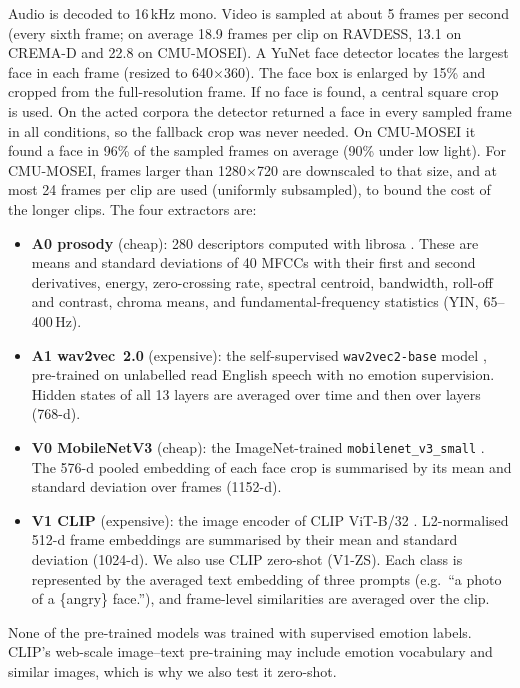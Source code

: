 Audio is decoded to 16\,kHz mono. Video is sampled at about 5 frames per second (every sixth frame; on average 18.9 frames per clip on RAVDESS, 13.1 on CREMA-D and 22.8 on CMU-MOSEI). A YuNet face detector \citep{wu2023yunet} locates the largest face in each frame (resized to 640$\times$360). The face box is enlarged by 15\% and cropped from the full-resolution frame. If no face is found, a central square crop is used. On the acted corpora the detector returned a face in every sampled frame in all conditions, so the fallback crop was never needed. On CMU-MOSEI it found a face in 96\% of the sampled frames on average (90\% under low light). For CMU-MOSEI, frames larger than 1280$\times$720 are downscaled to that size, and at most 24 frames per clip are used (uniformly subsampled), to bound the cost of the longer clips. The four extractors are:
\begin{itemize}
\item \textbf{A0 prosody} (cheap): 280 descriptors computed with librosa \citep{mcfee2015}. These are means and standard deviations of 40 MFCCs with their first and second derivatives, energy, zero-crossing rate, spectral centroid, bandwidth, roll-off and contrast, chroma means, and fundamental-frequency statistics (YIN, 65--400\,Hz).
\item \textbf{A1 wav2vec~2.0} (expensive): the self-supervised \texttt{wav2vec2-base} model \citep{baevski2020}, pre-trained on unlabelled read English speech with no emotion supervision. Hidden states of all 13 layers are averaged over time and then over layers (768-d).
\item \textbf{V0 MobileNetV3} (cheap): the ImageNet-trained \texttt{mobilenet\_v3\_small} \citep{howard2019}. The 576-d pooled embedding of each face crop is summarised by its mean and standard deviation over frames (1152-d).
\item \textbf{V1 CLIP} (expensive): the image encoder of CLIP ViT-B/32 \citep{radford2021}. L2-normalised 512-d frame embeddings are summarised by their mean and standard deviation (1024-d). We also use CLIP zero-shot (V1-ZS). Each class is represented by the averaged text embedding of three prompts (e.g.\ ``a photo of a \{angry\} face.''), and frame-level similarities are averaged over the clip.
\end{itemize}
None of the pre-trained models was trained with supervised emotion labels. CLIP's web-scale image--text pre-training may include emotion vocabulary and similar images, which is why we also test it zero-shot.

